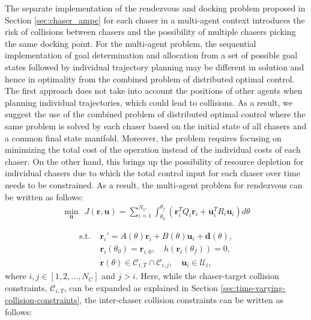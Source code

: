 The separate implementation of the rendezvous and docking problem proposed in Section \ref{sec:chaser_ampc} for each chaser in a multi-agent context introduces the risk of collisions between chasers and the possibility of multiple chasers picking the same docking point.
For the multi-agent problem, the sequential implementation of goal determination and allocation from a set of possible goal states followed by individual trajectory planning may be different in solution and hence in optimality from the combined problem of distributed optimal control.
The first approach does not take into account the positions of other agents when planning individual trajectories, which could lead to collisions.
As a result, we suggest the use of the combined problem of distributed optimal control where the same problem is solved by each chaser based on the initial state of all chasers and a common final state manifold.
Moreover, the problem requires focusing on minimizing the total cost of the operation instead of the individual costs of each chaser.
On the other hand, this brings up the possibility of resource depletion for individual chasers due to which the total control input for each chaser over time needs to be constrained.
As a result, the multi-agent problem for rendezvous can be written as follows:
\begin{align}
    \min_{\boldsymbol{u}}\ \ J(\boldsymbol{r},\boldsymbol{u})=\sum_{i=1}^{N_C}\int_{\theta_0}^{\theta_f}\left(\boldsymbol{r}_i^TQ_i\boldsymbol{r}_i+\boldsymbol{u}_i^TR_i\boldsymbol{u}_i\right)d\theta
\end{align}
\addtocounter{equation}{-1}
\vspace{-4ex}
\begin{subequations}
\begin{align}
    \textrm{s.t. } & \boldsymbol{r}_i'=A(\theta)\boldsymbol{r}_i+B(\theta)\boldsymbol{u}_i+\boldsymbol{d}(\theta),\\
    & \boldsymbol{r}_i(\theta_0)={\boldsymbol{r}}_{i,0},\quad h(\boldsymbol{r}_i(\theta_f))=0,\\
    & \boldsymbol{r}(\theta)\in{\mathcal{C}}_{i,T}\cap{\mathcal{C}}_{i,j},\quad\boldsymbol{u}_i\in{\mathcal{U}}_i,\label{eqn:multi-agent-rendezvous}
\end{align}
\end{subequations}
where $i,j\in[1,2,\ldots,N_C]$ and $j>i$.
Here, while the chaser-target collision constraints, ${\mathcal{C}}_{i,T}$, can be expanded as explained in Section \ref{sec:time-varying-collision-constraints}, the inter-chaser collision constraints can be written as follows:
